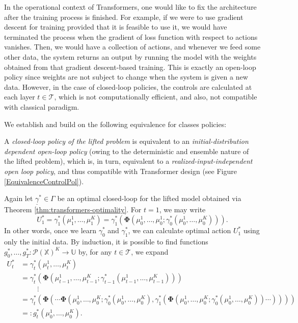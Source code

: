 \documentclass[11pt]{article}
\newcommand{\XX}{\mathbb{X}}
\newcommand{\UU}{\mathbb{U}}
\newcommand{\cP}{\mathcal{P}}
\newcommand{\cT}{\mathcal{T}}
\begin{document}
In the operational context of Transformers, one would like to fix the architecture after the training process is finished. For example, if we were to use gradient descent for training provided that it is feasible to use it, we would have terminated the process when the gradient of loss function with respect to actions vanishes. Then, we would have a collection of actions, and whenever we feed some other data, the system returns an output by running the model with the weights obtained from that gradient descent-based training. This is exactly an open-loop policy since weights are not subject to change when the system is given a new data. However, in the case of closed-loop policies, the controls are calculated at each layer $t\in\cT$, which is not computationally efficient, and also, not compatible with classical paradigm.

We establish and build on the following equivalence for classes policies:
\begin{center}
 A {\it closed-loop policy of the lifted problem} is equivalent to an {\it initial-distribution dependent open-loop policy} (owing to the deterministic and ensemble nature of the lifted problem), which is, in turn, equivalent to a {\it realized-input-independent open loop policy}, and thus compatible with Transformer design (see Figure \ref{EquivalenceControlPol}). 
\end{center}

Again let $\underline{\gamma}^*\in\Gamma$ be an optimal closed-loop for the lifted model obtained via Theorem \ref{thm:transformers-optimality}. For $t=1$, we may write
\begin{equation*}
    U_1^* = \gamma_1^*(\mu_1^1,\ldots,\mu_1^K) = \gamma_1^*(\bm{\Phi}(\mu_0^1,\ldots,\mu_0^1; \gamma_0^*(\mu_0^1,\ldots, \mu_0^K))).
\end{equation*}
In other words, once we learn $\gamma_0^*$ and $\gamma_1^*$, we can calculate optimal action $U_1^*$ using only the initial data. By induction, it is possible to find functions $g_0^*,\ldots,g_T^*:\cP(\XX)^K\to\UU$ by, for any $t\in\cT$, we expand
\begin{align*} 
    U_t^* &= \gamma_t^*(\mu_t^1,\ldots,\mu_t^K) \\
    &=\gamma_t^*(\bm{\Phi}(\mu_{t-1}^1,\ldots,\mu_{t-1}^K;\gamma_{t-1}^*(\mu_{t-1}^1,\ldots,\mu_{t-1}^K)))\\
    &\hspace{1cm}\vdots\\
    &=\gamma_t^*(\bm{\Phi}(\cdots\bm{\Phi}(\mu_0^1,\ldots, \mu_0^K;\gamma_0^*(\mu_0^1,\ldots, \mu_0^K), \gamma_1^*(\bm{\Phi}(\mu_0^1,\ldots, \mu_0^K;\gamma_0^*(\mu_0^1,\ldots, \mu_0^K))\cdots))))\\
    &=: g_t^*(\mu_0^1,\ldots,\mu_0^K).
\end{align*}
\end{document}
